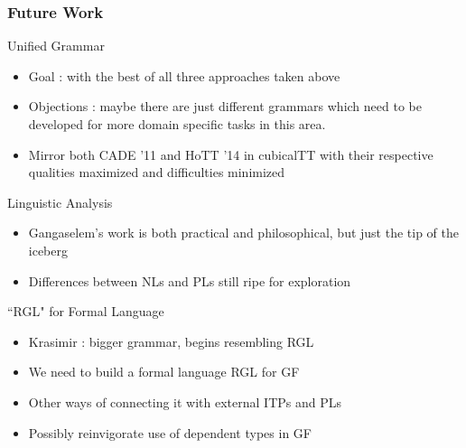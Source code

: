 \documentclass[9pt]{beamer}
\begin{document}
\begin{frame}
\frametitle{Future Work}

\begin{block}{Unified Grammar}
\begin{itemize}
\item  Goal : with the best of all three approaches taken above
\item  Objections : maybe there are just different grammars which need to be
  developed for more domain specific tasks in this area.
\item Mirror both CADE '11 and HoTT '14 in cubicalTT with their respective
  qualities maximized and difficulties minimized
\end{itemize}
\end{block}

\begin{block}{Linguistic Analysis}
\begin{itemize}
\item  Gangaselem's work is both practical and philosophical, but just the tip
  of the iceberg
\item  Differences between NLs and PLs still ripe for exploration
\end{itemize}
\end{block}

\begin{block}{``RGL" for Formal Language}
\begin{itemize}
\item  Krasimir : bigger grammar, begins resembling RGL
\item We need to build a formal language RGL for GF
\item Other ways of connecting it with external ITPs and PLs
\item Possibly reinvigorate use of dependent types in GF
\end{itemize}
\end{block}
\end{frame}
\end{document}
